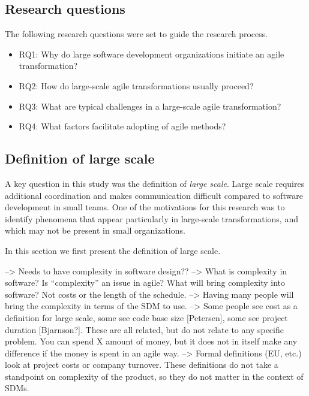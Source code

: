 \documentclass[preprint,authoryear,12pt]{elsarticle}
\begin{document}
\subsection{Research questions}

The following research questions were set to guide the research process.

\begin{itemize}

\item
RQ1: Why do large software development organizations initiate an agile
transformation?

\item
RQ2: How do large-scale agile transformations usually proceed?

\item
RQ3: What are typical challenges in a large-scale agile transformation?

\item
RQ4: What factors facilitate adopting of agile methods?

\end{itemize}


\subsection{Definition of large scale}
\label{sec:largescale}

A key question in this study was the definition of \emph{large scale}. Large
scale requires additional coordination and makes communication difficult
compared to software development in small teams. One of the motivations for this
research was to identify phenomena that appear particularly in large-scale
transformations, and which may not be present in small organizations.

In this section we first present the definition of large scale.

--> Needs to have complexity in software design?? --> What is complexity in software?
    Is ``complexity'' an issue in agile?
    What will bring complexity into software? Not costs or the length of the
    schedule. --> Having many people will bring the complexity in terms of the
    SDM to use.
--> Some people see cost as a definition for large scale, some see code base
    size [Petersen], some see project duration [Bjarnson?]. These are all
    related, but do not relate to any specific problem. You can spend X amount
    of money, but it does not in itself make any difference if the money is
    spent in an agile way.
--> Formal definitions (EU, etc.) look at project costs or company turnover.
    These definitions do not take a standpoint on complexity of the product, so
    they do not matter in the context of SDMs.
\end{document}
